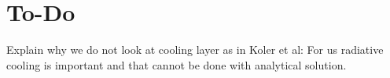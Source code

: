 \section{To-Do}
Explain why we do not look at cooling layer as in Koler et al: For us radiative cooling is important and that cannot be done with analytical solution.
